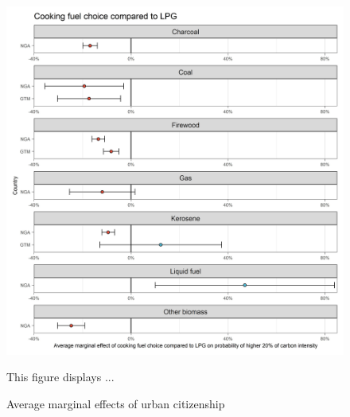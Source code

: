 \documentclass[12pt, a4paper]{article}
\newenvironment{subcaption}
{\strut
\vspace{-5pt}
\begin{minipage}[b]{0.9\textwidth}
  \hspace*{-\parindent}
  \footnotesize}
 {\end{minipage}}
\begin{document}
 \begin{figure}[ht!]
   \centering
   \caption{Average marginal effects of urban citizenship} \label{fig:F8_LPG}
   \includegraphics{Analysis_Logit_Models_Marginal_Effects/Average_Marginal_Effects_affected_upper_80_CF_LPG}
   \begin{subcaption}
     This figure displays ...
   \end{subcaption}
 \end{figure}

 \clearpage
\end{document}
